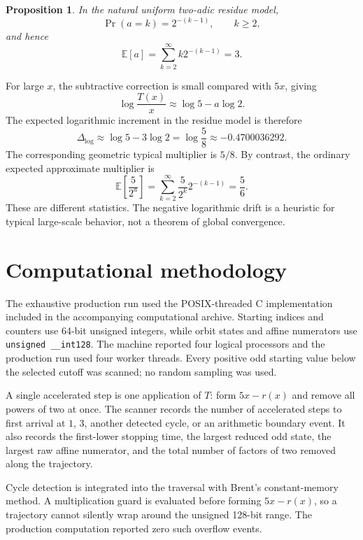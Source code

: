 \documentclass[11pt]{article}
\newtheorem{proposition}{Proposition}
\begin{document}
\begin{proposition}
In the natural uniform two-adic residue model,
\begin{equation}
\Pr(a=k)=2^{-(k-1)},\qquad k\ge2,
\end{equation}
and hence
\begin{equation}
\mathbb E[a]
=\sum_{k=2}^{\infty}k2^{-(k-1)}
=3.
\end{equation}
\end{proposition}

For large $x$, the subtractive correction is small compared with $5x$, giving
\[
\log\frac{T(x)}x
\approx\log5-a\log2.
\]
The expected logarithmic increment in the residue model is therefore
\begin{equation}
\Delta_{\log}
\approx\log5-3\log2
=\log\frac58
\approx-0.4700036292.
\end{equation}
The corresponding geometric typical multiplier is $5/8$. By contrast, the ordinary expected approximate multiplier is
\[
\mathbb E\!\left[\frac5{2^a}\right]
=\sum_{k=2}^{\infty}\frac5{2^k}2^{-(k-1)}
=\frac56.
\]
These are different statistics. The negative logarithmic drift is a heuristic for typical large-scale behavior, not a theorem of global convergence.

\section{Computational methodology}

The exhaustive production run used the POSIX-threaded C implementation included in the accompanying computational archive. Starting indices and counters use 64-bit unsigned integers, while orbit states and affine numerators use \texttt{unsigned \_\_int128}. The machine reported four logical processors and the production run used four worker threads. Every positive odd starting value below the selected cutoff was scanned; no random sampling was used.

A single accelerated step is one application of $T$: form $5x-r(x)$ and remove all powers of two at once. The scanner records the number of accelerated steps to first arrival at $1$, $3$, another detected cycle, or an arithmetic boundary event. It also records the first-lower stopping time, the largest reduced odd state, the largest raw affine numerator, and the total number of factors of two removed along the trajectory.

Cycle detection is integrated into the traversal with Brent's constant-memory method. A multiplication guard is evaluated before forming $5x-r(x)$, so a trajectory cannot silently wrap around the unsigned 128-bit range. The production computation reported zero such overflow events.
\end{document}
